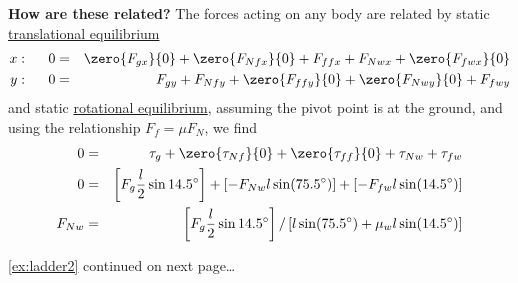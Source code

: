 \documentclass[11pt,letter,openany,makeidx]{book}
\begin{document}
\begin{example}[p]
{\begin{minipage}{4.925in}
\textbf{How are these related?}  The forces acting on any body are related by static \hyperref[ss:transeq]{translational equilibrium}
\begin{eqnarray*}
x: \hspace{.5cm} 0 & = & \zero{F_{gx}}{0} + \zero{F_{Nfx}}{0} + F_{ffx} + F_{Nwx} + \zero{F_{fwx}}{0} \\
y: \hspace{.5cm} 0 & = & F_{gy} + F_{Nfy} + \zero{F_{ffy}}{0} + \zero{F_{Nwy}}{0} + F_{fwy}
\end{eqnarray*}
and static \hyperref[ss:roteq]{rotational equilibrium}, assuming the pivot point is at the ground, and using the relationship $F_f=\mu F_N$, we find
\begin{eqnarray*}
0 & = & \tau_{g} + \zero{\tau_{Nf}}{0} + \zero{\tau_{ff}}{0} + \tau_{Nw} + \tau_{fw} \\
0 & = & \left[ F_g \frac{l}{2} \sin 14.5^\circ \right] + \left[ - F_{Nw} l \sin(75.5^\circ) \right] + \left[ - F_{fw} l \sin(14.5^\circ) \right] \\
F_{Nw} & = & \left[ F_g \frac{l}{2} \sin 14.5^\circ \right] / \left[  l \sin(75.5^\circ) + \mu_w l \sin(14.5^\circ) \right]
\end{eqnarray*}


{}\hfill {\footnotesize\autoref*{ex:ladder2} continued on next page\ldots}
\end{minipage}}
\end{example}
\end{document}
